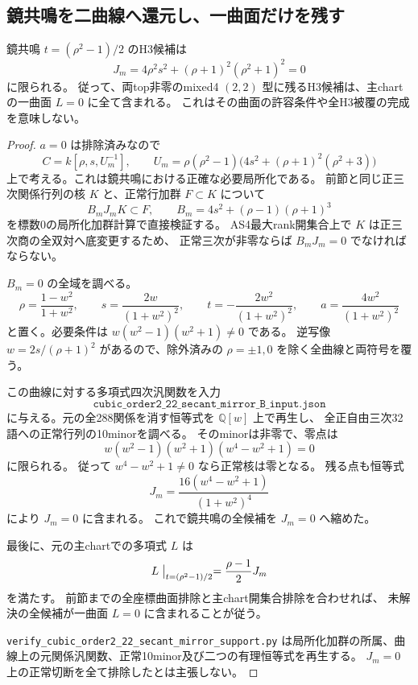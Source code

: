 \subsection{鏡共鳴を二曲線へ還元し、一曲面だけを残す}
\begin{proposition}
鏡共鳴 $t=(\rho^2-1)/2$ のH3候補は
\[
 J_m=4\rho^2s^2+(\rho+1)^2(\rho^2+1)^2=0
\]
に限られる。
従って、両top非零のmixed4 $(2,2)$ 型に残るH3候補は、主chartの一曲面 $L=0$ に全て含まれる。
これはその曲面の許容条件や全H3被覆の完成を意味しない。
\end{proposition}
\begin{proof}
$a=0$ は排除済みなので
\[
 C=k[\rho,s,U_m^{-1}],\qquad
 U_m=\rho(\rho^2-1)\bigl(4s^2+(\rho+1)^2(\rho^2+3)\bigr)
\]
上で考える。これは鏡共鳴における正確な必要局所化である。
前節と同じ正三次関係行列の核 $K$ と、正常行加群 $F\subset K$ について
\[
 B_mJ_m K\subset F,\qquad B_m=4s^2+(\rho-1)(\rho+1)^3
\]
を標数0の局所化加群計算で直接検証する。
AS4最大rank開集合上で $K$ は正三次商の全双対へ底変更するため、
正常三次が非零ならば $B_mJ_m=0$ でなければならない。

$B_m=0$ の全域を調べる。
\[
 \rho=\frac{1-w^2}{1+w^2},\qquad
 s=\frac{2w}{(1+w^2)^2},\qquad
 t=-\frac{2w^2}{(1+w^2)^2},\qquad
 a=\frac{4w^2}{(1+w^2)^2}
\]
と置く。必要条件は $w(w^2-1)(w^2+1)\ne0$ である。
逆写像 $w=2s/(\rho+1)^2$ があるので、除外済みの $\rho=\pm1,0$ を除く全曲線と両符号を覆う。

この曲線に対する多項式四次汎関数を入力
\[
 \texttt{cubic\_order2\_22\_secant\_mirror\_B\_input.json}
\]
に与える。元の全288関係を消す恒等式を $\mathbb Q[w]$ 上で再生し、
全正自由三次32語への正常行列の10minorを調べる。
そのminorは非零で、零点は
\[
 w(w^2-1)(w^2+1)(w^4-w^2+1)=0
\]
に限られる。
従って $w^4-w^2+1\ne0$ なら正常核は零となる。
残る点も恒等式
\[
 J_m=\frac{16(w^4-w^2+1)}{(1+w^2)^4}
\]
により $J_m=0$ に含まれる。
これで鏡共鳴の全候補を $J_m=0$ へ縮めた。

最後に、元の主chartでの多項式 $L$ は
\[
 L\bigm|_{t=(\rho^2-1)/2}=\frac{\rho-1}{2}J_m
\]
を満たす。
前節までの全座標曲面排除と主chart開集合排除を合わせれば、
未解決の全候補が一曲面 $L=0$ に含まれることが従う。

\texttt{verify\_cubic\_order2\_22\_secant\_mirror\_support.py}
は局所化加群の所属、曲線上の元関係汎関数、正常10minor及び二つの有理恒等式を再生する。
$J_m=0$ 上の正常切断を全て排除したとは主張しない。
\end{proof}
